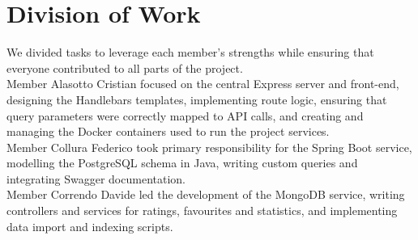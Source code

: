 \documentclass[12pt,a4paper]{article}
\begin{document}
\section{Division of Work}

We divided tasks to leverage each member's strengths while ensuring that everyone contributed to all parts of the project.\\
Member Alasotto Cristian focused on the central Express server and front-end, designing the Handlebars templates, implementing route logic, ensuring that query parameters were correctly mapped to API calls, and creating and managing the Docker containers used to run the project services.\\
Member Collura Federico took primary responsibility for the Spring Boot service, modelling the PostgreSQL schema in Java, writing custom queries and integrating Swagger documentation.\\
Member Correndo Davide led the development of the MongoDB service, writing controllers and services for ratings, favourites and statistics, and implementing data import and indexing scripts.\\
\end{document}
